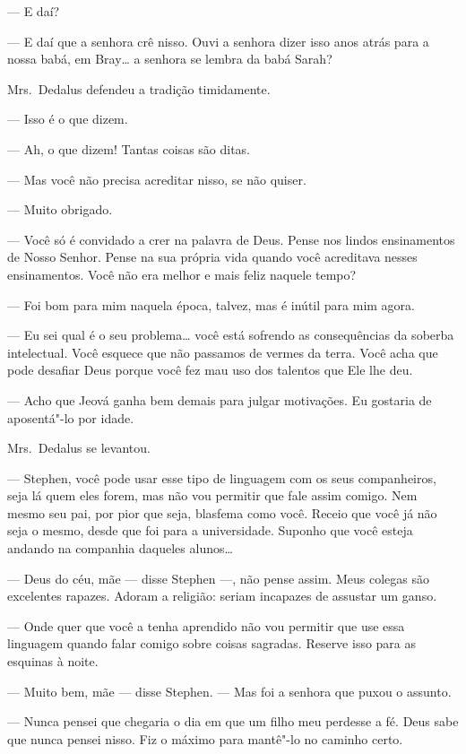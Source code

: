 --- E daí?

--- E daí que a senhora crê nisso.  Ouvi a senhora dizer isso anos atrás para a
nossa babá, em Bray\ldots{} a senhora se lembra da babá Sarah?

Mrs.~Dedalus defendeu a tradição timidamente.

--- Isso é o que dizem.

--- Ah, o que dizem!  Tantas coisas são ditas.

--- Mas você não precisa acreditar nisso, se não quiser.

--- Muito obrigado.

--- Você só é convidado a crer na palavra de Deus.  Pense nos lindos
ensinamentos de Nosso Senhor.  Pense na sua própria vida quando você acreditava
nesses ensinamentos.  Você não era melhor e mais feliz naquele tempo?

--- Foi bom para mim naquela época, talvez, mas é inútil para mim agora.

--- Eu sei qual é o seu problema\ldots{} você está sofrendo as consequências da
soberba intelectual.  Você esquece que não passamos de vermes da terra.  Você
acha que pode desafiar Deus porque você fez mau uso dos talentos que Ele lhe
deu.

--- Acho que Jeová ganha bem demais para julgar motivações.  Eu gostaria de
aposentá"-lo por idade.

Mrs.~Dedalus se levantou.

--- Stephen, você pode usar esse tipo de linguagem com os seus companheiros,
seja lá quem eles forem, mas não vou permitir que fale assim comigo.  Nem mesmo
seu pai, por pior que seja, blasfema como você.  Receio que você já não seja o
mesmo, desde que foi para a universidade.  Suponho que você esteja andando na
companhia daqueles alunos\ldots{}

--- Deus do céu, mãe --- disse Stephen ---, não pense assim.  Meus colegas são
excelentes rapazes.  Adoram a religião: seriam incapazes de assustar um ganso.

--- Onde quer que você a tenha aprendido não vou permitir que use essa
linguagem quando falar comigo sobre coisas sagradas.  Reserve isso para as
esquinas à noite.

--- Muito bem, mãe --- disse Stephen.  --- Mas foi a senhora que puxou o
assunto.

--- Nunca pensei que chegaria o dia em que um filho meu perdesse a fé.  Deus
sabe que nunca pensei nisso.  Fiz o máximo para mantê"-lo no caminho certo.

